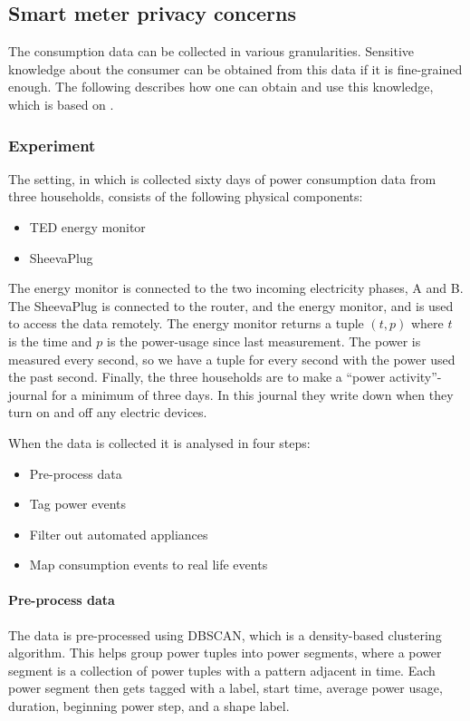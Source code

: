 \subsection{Smart meter privacy concerns}\label{smart_meter_privacy}
The consumption data can be collected in various granularities.
Sensitive knowledge about the consumer can be obtained from this data if it is fine-grained enough.
The following describes how one can obtain and use this knowledge, which is based on \citet{privacy_memoir}.

\subsubsection{Experiment}
The setting, in which is collected sixty days of power consumption data from three households, consists of the following physical components:
\begin{itemize}
\item TED energy monitor
\item SheevaPlug
\end{itemize}
The energy monitor is connected to the two incoming electricity phases, A and B.\cite{TED_installation_guide}
The SheevaPlug is connected to the router, and the energy monitor, and is used to access the data remotely.
The energy monitor returns a tuple $(t,p)$ where $t$ is the time and $p$ is the power-usage since last measurement.
The power is measured every second, so we have a tuple for every second with the power used the past second.
Finally, the three households are to make a ``power activity''-journal for a minimum of three days.
In this journal they write down when they turn on and off any electric devices.

When the data is collected it is analysed in four steps:
\begin{itemize}
\item Pre-process data
\item Tag power events
\item Filter out automated appliances
\item Map consumption events to real life events
\end{itemize}

\paragraph{Pre-process data}
The data is pre-processed using DBSCAN, which is a density-based clustering algorithm.
This helps group power tuples into power segments, where a power segment is a collection of power tuples with a pattern adjacent in time.
Each power segment then gets tagged with a label, start time, average power usage, duration, beginning power step, and a shape label.

